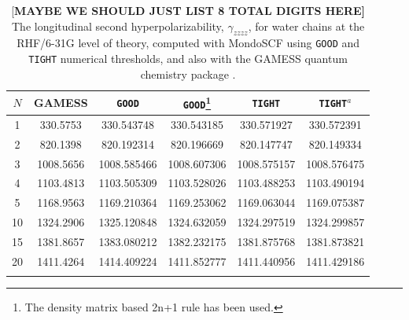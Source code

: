 \documentclass[prl,aps,letterpaper,twocolumn,showpacs,twocolumngrid,superbib]{revtex4}
\begin{document}
\begin{table}[h]
  \centering
  \caption{\protect
		{[\bf MAYBE WE SHOULD JUST LIST 8 TOTAL DIGITS HERE]}
    The longitudinal second hyperpolarizability, $\gamma_{zzzz}$,
    for water chains at the RHF/6-31G level of theory, computed with 
    {\sc MondoSCF} using {\tt GOOD} and {\tt TIGHT} numerical thresholds, 
    and also with the {\sc GAMESS} quantum chemistry package \cite{gamess}.
  }\label{tab:Gamma_1D_Values}
  \begin{tabular}{cccccc}
    \toprule
    $N$ &\multicolumn{1}{c}{{\sc GAMESS}}
    &\multicolumn{1}{c}{{\tt GOOD}}
    &\multicolumn{1}{c}{{\tt GOOD}\footnote[1]{The density matrix based 2n+1 rule has been used.}}
    &\multicolumn{1}{c}{{\tt TIGHT}}
    &\multicolumn{1}{c}{{\tt TIGHT}$^a$} \\
    \hline
     1 &  330.5753 &  330.543748 &  330.543185 &  330.571927 &  330.572391 \\
     2 &  820.1398 &  820.192314 &  820.196669 &  820.147747 &  820.149334 \\
     3 & 1008.5656 & 1008.585466 & 1008.607306 & 1008.575157 & 1008.576475 \\
     4 & 1103.4813 & 1103.505309 & 1103.528026 & 1103.488253 & 1103.490194 \\
     5 & 1168.9563 & 1169.210364 & 1169.253062 & 1169.063044 & 1169.075387 \\
    10 & 1324.2906 & 1325.120848 & 1324.632059 & 1324.297519 & 1324.299857 \\
    15 & 1381.8657 & 1383.080212 & 1382.232175 & 1381.875768 & 1381.873821 \\
    20 & 1411.4264 & 1414.409224 & 1411.852777 & 1411.440956 & 1411.429186 \\
    \botrule
  \end{tabular}
\end{table}
\end{document}

